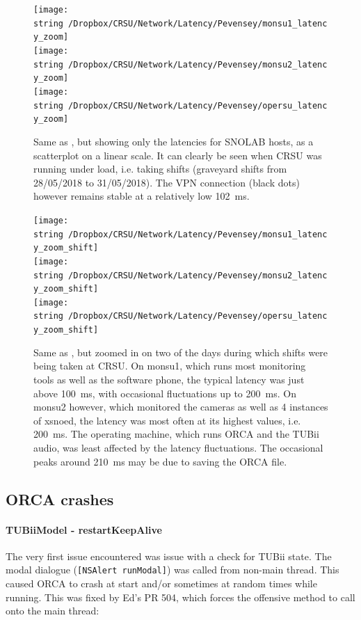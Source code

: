 \documentclass[a4paper,10pt]{article}
\begin{document}
\begin{figure}[htp]
	\centering
	\texttt{[image: \\string~/Dropbox/CRSU/Network/Latency/Pevensey/monsu1\_latency\_zoom]}\\
	\texttt{[image: \\string~/Dropbox/CRSU/Network/Latency/Pevensey/monsu2\_latency\_zoom]}\\
	\texttt{[image: \\string~/Dropbox/CRSU/Network/Latency/Pevensey/opersu\_latency\_zoom]}
	\caption{Same as , but showing only the latencies for SNOLAB hosts, as a scatterplot on a linear scale. It can clearly be seen when CRSU was running under load, i.e. taking shifts (graveyard shifts from 28/05/2018 to 31/05/2018). The VPN connection (black dots) however remains stable at a relatively low 102~ms.}
	\label{latency_final_2}
\end{figure}

\begin{figure}[htp]
	\centering
	\texttt{[image: \\string~/Dropbox/CRSU/Network/Latency/Pevensey/monsu1\_latency\_zoom\_shift]}\\
	\texttt{[image: \\string~/Dropbox/CRSU/Network/Latency/Pevensey/monsu2\_latency\_zoom\_shift]}\\
	\texttt{[image: \\string~/Dropbox/CRSU/Network/Latency/Pevensey/opersu\_latency\_zoom\_shift]}
	\caption{Same as , but zoomed in on two of the days during which shifts were being taken at CRSU. On monsu1, which runs most monitoring tools as well as the software phone, the typical latency was just above 100~ms, with occasional fluctuations up to 200~ms. On monsu2 however, which monitored the cameras as well as 4 instances of xsnoed, the latency was most often at its highest values, i.e. 200~ms. The operating machine, which runs ORCA and the TUBii audio, was least affected by the latency fluctuations. The occasional peaks around 210~ms may be due to saving the ORCA file.}
	\label{latency_final_3}
\end{figure}


\clearpage
\subsection{ORCA crashes\label{app:ORCA}}
\paragraph{TUBiiModel - restartKeepAlive}
The very first issue encountered was issue with a check for TUBii state. The modal dialogue ({\tt [NSAlert runModal]}) was called from non-main thread. This caused ORCA to crash at start and/or sometimes at random times while running. This was fixed by Ed's PR 504, which forces the offensive method to call onto the main thread:
\end{document}
